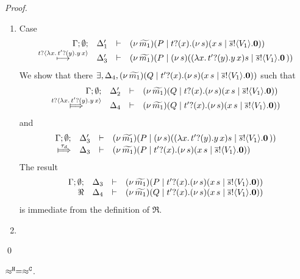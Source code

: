 \begin{proof}
\begin{enumerate}
		\item	Case
			\[
				\begin{array}{rcll} \Gamma; \emptyset; &\Delta_1'& \vdash& (\nu\, \widetilde{m_1})(P \;|\; t ? (x) . (\nu\, s)(x\, {s} \;|\; \overline{s} ! \langle V_1 \rangle . \mathbf{0}))\\ \stackrel{t ? \langle  \lambda x.\,t' ? (y) .{y\, {x}}  \rangle}{\longmapsto} &\Delta_3'& \vdash &  (\nu\, \widetilde{m_1})(P \;|\; (\nu\, s)(  (\lambda x.\,t' ? (y) .{y\, {x}}){s}  \;|\; \overline{s} ! \langle V_1 \rangle . \mathbf{0} \, {)}) \end{array}
			\]
			We show that there $\exists, \Delta_4, (\nu\, \widetilde{m_1})(Q \;|\; t' ? (x) . (\nu\, s)(x\, {s} \;|\; \overline{s} ! \langle V_1 \rangle . \mathbf{0}))$ such that
			\[
				\mhorel{\Gamma}{\Delta_2'}{\newsp{\widetilde{m_1}}{Q \Par \hotrigger{t}{x}{s}{V_1}}}
				{\Hby{\bactinp{t}{ \abs{x}{\binp{t'}{y}{\appl{y}{x}}  }}}}
				{\Delta_4}{}{\newsp{\widetilde{m_1}}{Q \Par \hotrigger{t'}{x}{s}{V_1}}}
			\]
			and
			\[
				\mhorel{\Gamma}{\Delta_3'}{\newsp{\widetilde{m_1}}{P \Par \newsp{s}{  \appl{(\abs{x}{\binp{t'}{y}{\appl{y}{x}})}{s}  \Par \bout{\dual{s}}{V_1} \inact }}}}
				{\Hby{\tau_d}}
				{\Delta_3}{}{\newsp{\widetilde{m_1}}{P \Par \hotrigger{t'}{x}{s}{V_1}}}
			\]
			The result
			\[
				\begin{array}{rcll} \Gamma; \emptyset; &\Delta_3& \vdash& (\nu\, \widetilde{m_1})(P \;|\; t' ? (x) . (\nu\, s)(x\, {s} \;|\; \overline{s} ! \langle V_1 \rangle . \mathbf{0}))\\ \Re &\Delta_4& \vdash &  (\nu\, \widetilde{m_1})(Q \;|\; t' ? (x) . (\nu\, s)(x\, {s} \;|\; \overline{s} ! \langle V_1 \rangle . \mathbf{0})) \end{array}
			\]
			is immediate from the definition of $\Re$.

	\item {}
	\end{enumerate}
	\qed
\end{proof}



\begin{lemma}
	\label{app:lem:wb_eq_wbf}
	$\approx^\mathtt{H} = \approx^\mathtt{C}$.
\end{lemma}

